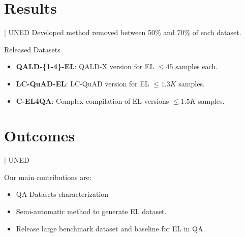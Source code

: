 \documentclass[]{beamer}
\def\mAlertSpace{\vspace{0.5em}}
\newcommand{\mShortTitle}{\secname \hfill {\scriptsize$|$ UNED}}
\begin{document}
\section{Results}
  \begin{frame}{\mShortTitle}
    Developed method removed between 50\% and 70\% of each dataset.
    \mAlertSpace
    \begin{alertblock}{Released Datasets}
      \begin{itemize}
        \item \textbf{QALD-\{1-4\}-EL}: QALD-X version for EL $\le 45$ samples each.
        \item \textbf{LC-QuAD-EL}: LC-QuAD version for EL $\le 1.3K$ samples.
        \item \textbf{C-EL4QA}: Complex compilation of EL versions $\le 1.5K$ samples.
      \end{itemize}
    \end{alertblock}
  \end{frame}

\section{Outcomes}
  \begin{frame}{\mShortTitle}
    \begin{alertblock}{Our main contributions are:}
      \begin{itemize}
        \item QA Datasets characterization
        \item Semi-automatic method to generate EL dataset.
        \item Release large benchmark dataset and baseline for EL in QA.
      \end{itemize}
    \end{alertblock}      
  \end{frame}
\end{document}
